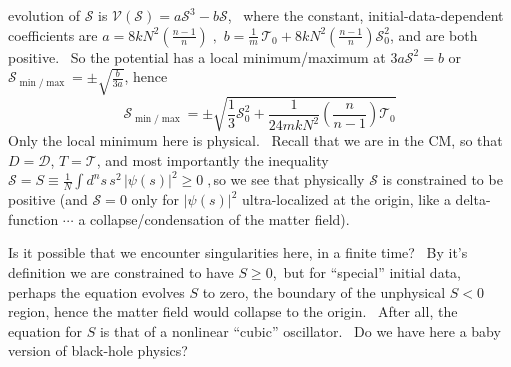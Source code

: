 \documentclass[a4paper,12pt]{article}%
\begin{document}
evolution of $\mathcal{S}$ is $\mathcal{V}\left(  \mathcal{S}\right)
=a\mathcal{S}^{3}-b\mathcal{S}$, \ where the constant, initial-data-dependent
coefficients are $a=8kN^{2}\left(  \frac{n-1}{n}\right)  \;,$ $b=\frac{1}%
{m}\,\mathcal{T}_{0}+8kN^{2}\left(  \frac{n-1}{n}\right)  \mathcal{S}_{0}^{2}%
$, and are both positive. \ So the potential has a local minimum/maximum at
$3a\mathcal{S}^{2}=b$ or $\mathcal{S}_{\min/\max}=\pm\sqrt{\frac{b}{3a}}$,
hence
\[
\mathcal{S}_{\min/\max}=\pm\sqrt{\frac{1}{3}\mathcal{S}_{0}^{2}+\frac{1}%
{24mkN^{2}}\left(  \frac{n}{n-1}\right)  \mathcal{T}_{0}}%
\]
Only the local minimum here is physical. \ Recall that we are in the CM, so
that $D=\mathcal{D}$, $T=\mathcal{T}$, and most importantly the inequality
$\mathcal{S}=S\equiv\frac{1}{N}\int d^{n}s\,s^{2}\,\left|  \psi\left(
s\right)  \right|  ^{2}\geq0\;,$so we see that physically $\mathcal{S}$ is
constrained to be positive (and $\mathcal{S}=0$ only for $\left|  \psi\left(
s\right)  \right|  ^{2}$ ultra-localized at the origin, like a delta-function
$\cdots$ a collapse/condensation of the matter field).

Is it possible that we encounter singularities here, in a finite time? \ By
it's definition we are constrained to have $S\geq0$,\ but for ``special''
initial data, perhaps the equation evolves $S$ to zero, the boundary of the
unphysical $S<0$ region, hence the matter field would collapse to the origin.
\ After all, the equation for $S$ is that of a nonlinear ``cubic'' oscillator.
\ Do we have here a baby version of black-hole physics?\ 
\end{document}
